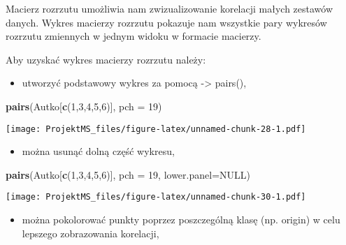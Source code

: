 \documentclass[
]{article}
\newenvironment{Shaded}{\begin{snugshade}}{\end{snugshade}}
\newcommand{\DataTypeTok}[1]{\textcolor[rgb]{0.13,0.29,0.53}{#1}}
\newcommand{\DecValTok}[1]{\textcolor[rgb]{0.00,0.00,0.81}{#1}}
\newcommand{\FloatTok}[1]{\textcolor[rgb]{0.00,0.00,0.81}{#1}}
\newcommand{\KeywordTok}[1]{\textcolor[rgb]{0.13,0.29,0.53}{\textbf{#1}}}
\newcommand{\NormalTok}[1]{#1}
\newcommand{\OperatorTok}[1]{\textcolor[rgb]{0.81,0.36,0.00}{\textbf{#1}}}
\newcommand{\OtherTok}[1]{\textcolor[rgb]{0.56,0.35,0.01}{#1}}
\newcommand{\StringTok}[1]{\textcolor[rgb]{0.31,0.60,0.02}{#1}}
\providecommand{\tightlist}{%
  \setlength{\itemsep}{0pt}\setlength{\parskip}{0pt}}
\begin{document}
Macierz rozrzutu umożliwia nam zwizualizowanie korelacji małych zestawów
danych. Wykres macierzy rozrzutu pokazuje nam wszystkie pary wykresów
rozrzutu zmiennych w jednym widoku w formacie macierzy.

Aby uzyskać wykres macierzy rozrzutu należy:

\begin{itemize}
\tightlist
\item
  utworzyć podstawowy wykres za pomocą -\textgreater{} pairs(),
\end{itemize}

\begin{Shaded}
\begin{Highlighting}[]
\KeywordTok{pairs}\NormalTok{(Autko[}\KeywordTok{c}\NormalTok{(}\DecValTok{1}\NormalTok{,}\DecValTok{3}\NormalTok{,}\DecValTok{4}\NormalTok{,}\DecValTok{5}\NormalTok{,}\DecValTok{6}\NormalTok{)], }\DataTypeTok{pch =} \DecValTok{19}\NormalTok{)}
\end{Highlighting}
\end{Shaded}

\texttt{[image: ProjektMS\_files/figure-latex/unnamed-chunk-28-1.pdf]}

\begin{itemize}
\tightlist
\item
  można usunąć dolną część wykresu,
\end{itemize}

\begin{Shaded}
\begin{Highlighting}[]
\KeywordTok{pairs}\NormalTok{(Autko[}\KeywordTok{c}\NormalTok{(}\DecValTok{1}\NormalTok{,}\DecValTok{3}\NormalTok{,}\DecValTok{4}\NormalTok{,}\DecValTok{5}\NormalTok{,}\DecValTok{6}\NormalTok{)], }\DataTypeTok{pch =} \DecValTok{19}\NormalTok{, }\DataTypeTok{lower.panel=}\OtherTok{NULL}\NormalTok{)}
\end{Highlighting}
\end{Shaded}

\texttt{[image: ProjektMS\_files/figure-latex/unnamed-chunk-30-1.pdf]}

\begin{itemize}
\tightlist
\item
  można pokolorować punkty poprzez poszczególną klasę (np. origin) w
  celu lepszego zobrazowania korelacji,
\end{itemize}

\begin{Shaded}
\end{Shaded}
\end{document}
